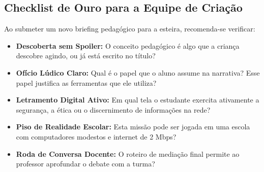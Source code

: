 \documentclass[11pt,a4paper]{article}
\begin{document}
\subsection{Checklist de Ouro para a Equipe de Criação}
Ao submeter um novo briefing pedagógico para a esteira, recomenda-se verificar:
\begin{itemize}[noitemsep]
  \item[$\square$] \textbf{Descoberta sem Spoiler:} O conceito pedagógico é algo que a criança descobre agindo, ou já está escrito no título?
  \item[$\square$] \textbf{Ofício Lúdico Claro:} Qual é o papel que o aluno assume na narrativa? Esse papel justifica as ferramentas que ele utiliza?
  \item[$\square$] \textbf{Letramento Digital Ativo:} Em qual tela o estudante exercita ativamente a segurança, a ética ou o discernimento de informações na rede?
  \item[$\square$] \textbf{Piso de Realidade Escolar:} Esta missão pode ser jogada em uma escola com computadores modestos e internet de 2 Mbps?
  \item[$\square$] \textbf{Roda de Conversa Docente:} O roteiro de mediação final permite ao professor aprofundar o debate com a turma?
\end{itemize}

\newpage


\end{document}
